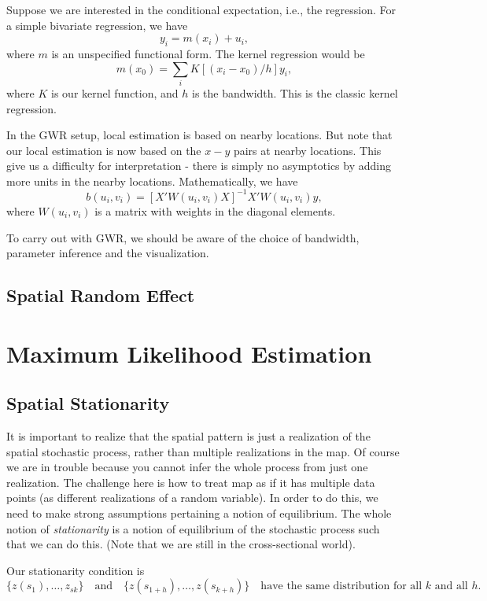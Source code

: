 \documentclass[11pt,a4paper]{amsart}
\theoremstyle{plain}
\theoremstyle{definition}
\begin{document}
Suppose we are interested in the conditional expectation, i.e., the regression. For a simple bivariate regression, we have 
\[	y_{i} = m(x_{i}) + u_{i},	\]
where $m$ is an unspecified functional form. The kernel regression would be 
\[	m(x_{0}) = \sum_{i} K[(x_{i} - x_{0})/h] y_{i},	\]
where $K$ is our kernel function, and $h$ is the bandwidth. This is the classic kernel regression.

In the GWR setup, local estimation is based on nearby locations. But note that our local estimation is now based on the $x-y$ pairs at nearby locations. This give us a difficulty for interpretation - there is simply no asymptotics by adding more units in the nearby locations. Mathematically, we have 
\[	b(u_{i}, v_{i}) = [X'W(u_{i}, v_{i})X]^{-1}X'W(u_{i}, v_{i})y,	\]
where $W(u_{i}, v_{i})$ is a matrix with weights in the diagonal elements.

To carry out with GWR, we should be aware of the choice of bandwidth, parameter inference and the visualization.

\subsection{Spatial Random Effect}\hfill\par 

\section{Maximum Likelihood Estimation}
\subsection{Spatial Stationarity}\hfill\par 
 It is important to realize that the spatial pattern is just a realization of the spatial stochastic process, rather than multiple realizations in the map. Of course we are in trouble because you cannot infer the whole process from just one realization. The challenge here is how to treat map as if it has multiple data points (as different realizations of a random variable). In order to do this, we need to make strong assumptions pertaining a notion of equilibrium. The whole notion of \textit{stationarity} is a notion of equilibrium of the stochastic process such that we can do this. (Note that we are still in the cross-sectional world). 
 
Our stationarity condition is 
\[	\{z(s_{1}), \dots, z_{s{k}}\} \quad \text{and}\quad \{z(s_{1+h}), \dots, z({s_{k+h}})\} \quad \text{have the same distribution for all $k$ and all $h$}.	\]
\end{document}
